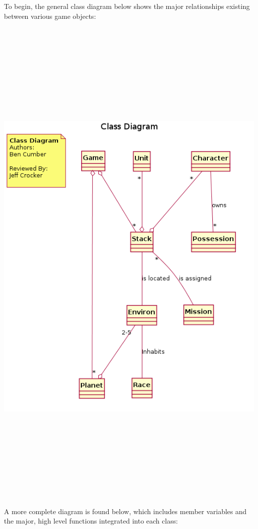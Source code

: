 \documentclass[twoside,letterpaper]{article}
\begin{document}
To begin, the general class diagram below shows the major relationships existing between various game objects:

\includegraphics[width=6in,height=10in]{class_overview.png}
\newpage
A more complete diagram is found below, which includes member variables and the major, high level functions integrated into each class:
\end{document}
